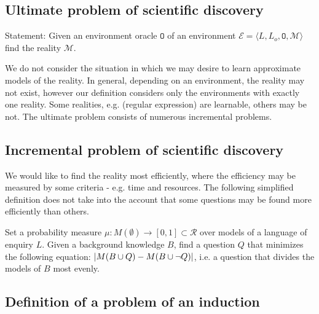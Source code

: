 \iffalse
\begin{defn}
\emph{An approximation by a theory}.
A theory $\Sigma$ approximates a theory $\Gamma$ with a \emph{recall} $r \defeq \mu(\{\phi \in \Gamma:\phi \in \Sigma\})$,
with a \emph{precision} $p \defeq \mu(\{\phi \in \Sigma:\phi \in \Gamma\})$,
with an accuracy $a \defeq \mu(\Sigma \cap \Gamma)$
where $\mu:\Sigma \union \Gamma \to \mathbb{R}$ is a measure.
\end{defn}

\begin{exmp}
\end{exmp}
\fi

\subsection{Ultimate problem of scientific discovery}
Statement: Given an environment oracle $\mathtt{O}$ of an environment $\mathcal{E}=\langle L, L_o, \mathtt{O}, \mathcal{M} \rangle$ find the reality $\mathcal{M}$.

We do not consider the situation in which we may desire to learn approximate models of the reality. In general, depending on an environment, the reality may not exist, however our definition considers only the environments with exactly one reality. Some realities, e.g. (regular expression) are learnable, others may be not. The ultimate problem consists of numerous incremental problems.

\subsection{Incremental problem of scientific discovery}
We would like to find the reality most efficiently, where the efficiency may be measured by some criteria - e.g. time and resources. The following simplified definition does not take into the account that some questions may be found more efficiently than others.

Set a probability measure $\mu:M(\emptyset) \to [0,1] \subset \mathcal{R}$ over models of a language of enquiry $L$. Given a background knowledge $B$, find a question $Q$ that minimizes the following equation: $|M(B \cup {Q})-M(B \cup {\neg Q})|$, i.e. a question that divides the models of $B$ most evenly.

\subsection{Definition of a problem of an induction}
